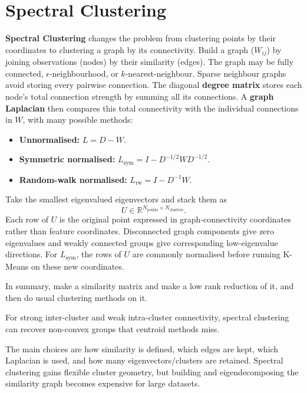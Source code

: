 \section{Spectral Clustering}
\textbf{Spectral Clustering} changes the problem from clustering points by their coordinates to clustering a graph by its connectivity.
Build a graph ($W_{ij}$) by joining observations (nodes) by their similarity (edges).
The graph may be fully connected, $\epsilon$-neighbourhood, or $k$-nearest-neighbour.
Sparse neighbour graphs avoid storing every pairwise connection.
The diagonal \textbf{degree matrix} stores each node's total connection strength by summing all its connections.
A \textbf{graph Laplacian} then compares this total connectivity with the individual connections in $W$, with many possible methods:
\begin{itemize}
    \item \textbf{Unnormalised:} $L=D-W$.
    \item \textbf{Symmetric normalised:} $L_{\mathrm{sym}}=I-D^{-1/2}WD^{-1/2}$.
    \item \textbf{Random-walk normalised:} $L_{\mathrm{rw}}=I-D^{-1}W$.
\end{itemize}

Take the smallest eigenvalued eigenvectors and stack them as
\[
    U\in\mathbb{R}^{N_{\mathrm{points}}\times N_{\mathrm{clusters}}}.
\]
Each row of $U$ is the original point expressed in graph-connectivity coordinates rather than feature coordinates.
Disconnected graph components give zero eigenvalues and weakly connected groups give corresponding low-eigenvalue directions.
For $L_{\mathrm{sym}}$, the rows of $U$ are commonly normalised before running K-Means on these new coordinates.

\begin{calloutintuition}
    In summary, make a similarity matrix and make a low rank reduction of it, and then do usual clustering methods on it.
\end{calloutintuition}

\begin{calloutpractical}
    For strong inter-cluster and weak intra-cluster connectivity, spectral clustering can recover non-convex groups that centroid methods miss.
\end{calloutpractical}

\begin{calloutpractical}
    The main choices are how similarity is defined, which edges are kept, which Laplacian is used, and how many eigenvectors/clusters are retained.
    Spectral clustering gains flexible cluster geometry, but building and eigendecomposing the similarity graph becomes expensive for large datasets.
\end{calloutpractical}

